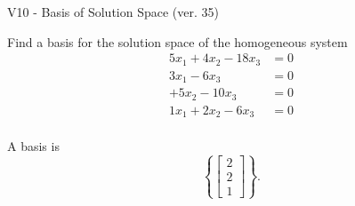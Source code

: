 \begin{exercise}
  \begin{exerciseTitle}V10 - Basis of Solution Space (ver. 35)\end{exerciseTitle}
  \begin{exerciseStatement}
    Find a basis for the solution space of the homogeneous system 
\begin{align*}
 5 x_ 1 + 4 x_ 2 -18 x_ 3 &= 0  \\ 
  3 x_ 1 -6 x_ 3 &= 0  \\ 
  + 5 x_ 2 -10 x_ 3 &= 0  \\ 
  1 x_ 1 + 2 x_ 2 -6 x_ 3 &= 0  \\ 
 \end{align*}


 
  \end{exerciseStatement}

  \begin{exerciseAnswer}
   A basis is   
\[\left\{\left[\begin{array}{c}
2 \\
2 \\
1
\end{array}\right]\right\}.\]

  


  \end{exerciseAnswer}
\end{exercise}